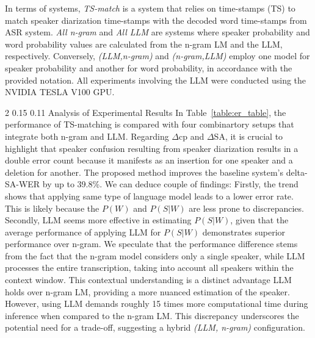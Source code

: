 \documentclass{article}
\makeatletter
\renewcommand{\subsection}{\@startsection
  {subsection}%
  {2}%
  {}%
  {0.15\baselineskip}%
  {0.11\baselineskip}%
  {}}%
\makeatother
\begin{document}
In terms of systems, \textit{TS-match} is a system that relies on time-stamps (TS) to match speaker diarization time-stamps with the decoded word time-stamps from ASR system. \textit{All n-gram} and \textit{All LLM} are systems where speaker probability and word probability values are calculated from the n-gram LM and the LLM, respectively. Conversely, \textit{(LLM,\;n-gram)} and \textit{(n-gram,\;LLM)} employ one model for speaker probability and another for word probability, in accordance with the provided notation. All experiments involving the LLM were conducted using the NVIDIA TESLA V100 GPU.

\subsection{Analysis of Experimental Results}
In Table~\ref{table:er_table}, the performance of TS-matching is compared with four combinartory setups that integrate both n-gram and LLM. Regarding $\Delta$cp and $\Delta$SA, it is crucial to highlight that speaker confusion resulting from speaker diarization results in a double error count because it manifests as an insertion for one speaker and a deletion for another. The proposed method improves the baseline system's delta-SA-WER by up to 39.8\%.
We can deduce couple of findings: Firstly, the trend shows that applying same type of language model leads to a lower error rate. This is likely because the $P(W)$ and $P(S|W)$ are less prone to discrepancies. Secondly, LLM seems more effective in estimating $P(S|W)$, given that the average performance of applying LLM for $P(S|W)$ demonstrates superior performance over n-gram.  We speculate that the performance difference stems from the fact that the n-gram model considers only a single speaker, while LLM processes the entire transcription, taking into account all speakers within the context window. This contextual understanding is a distinct advantage LLM holds over n-gram LM, providing a more nuanced estimation of the speaker. However, using LLM demands roughly 15 times more computational time during inference when compared to the n-gram LM. This discrepancy underscores the potential need for a trade-off, suggesting a hybrid \textit{(LLM, n-gram)} configuration.
\end{document}
